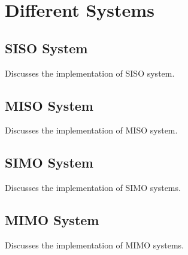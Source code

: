 \section{Different Systems}
\subsection{SISO System}
Discusses the implementation of SISO system.

\subsection{MISO System}
Discusses the implementation of MISO system.

\subsection{SIMO System}
Discusses the implementation of SIMO systems.

\subsection{MIMO System}
Discusses the implementation of MIMO systems.
 